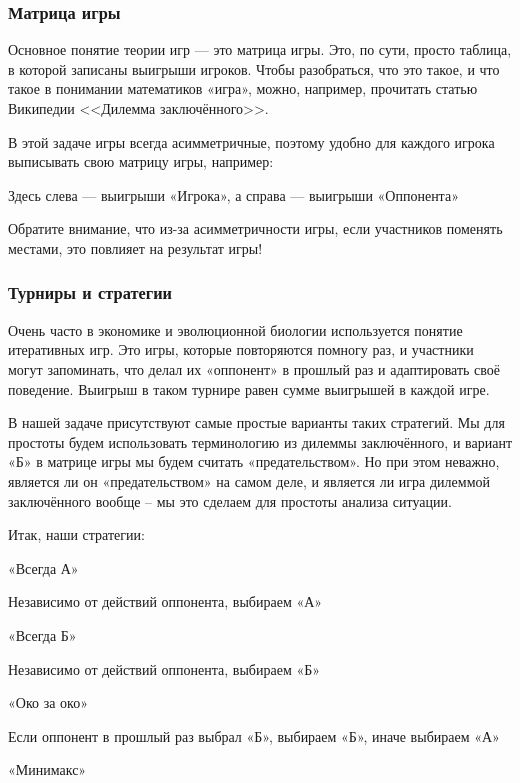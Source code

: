 
\subsubsection{Матрица игры}

Основное понятие теории игр — это матрица игры.
Это, по сути, просто таблица, в которой записаны выигрыши игроков.
Чтобы разобраться, что это такое, и что такое в понимании математиков «игра», можно, например, 
прочитать статью Википедии <<Дилемма заключённого>>.

В этой задаче игры всегда асимметричные, поэтому удобно для каждого игрока выписывать свою матрицу игры, например:


Здесь слева — выигрыши «Игрока», а справа — выигрыши «Оппонента»

Обратите внимание, что из-за асимметричности игры, если участников поменять местами, это повлияет на результат игры!

\subsubsection{Турниры и стратегии}

Очень часто в экономике и эволюционной биологии используется понятие итеративных игр. Это игры, которые повторяются помногу раз, и участники могут запоминать, что делал их «оппонент» в прошлый раз и адаптировать своё поведение. Выигрыш в таком турнире равен сумме выигрышей в каждой игре.

В нашей задаче присутствуют самые простые варианты таких стратегий.
Мы для простоты будем использовать терминологию из дилеммы заключённого, и вариант «Б» в матрице игры мы будем считать «предательством». Но при этом неважно, является ли он «предательством» на самом деле, и является ли игра дилеммой заключённого вообще – мы это сделаем для простоты анализа ситуации.

Итак, наши стратегии: 

«Всегда А»

Независимо от действий оппонента, выбираем «А»

«Всегда Б»

Независимо от действий оппонента, выбираем «Б»

«Око за око»

Если оппонент в прошлый раз выбрал «Б», выбираем «Б», иначе выбираем «А»

«Минимакс»

